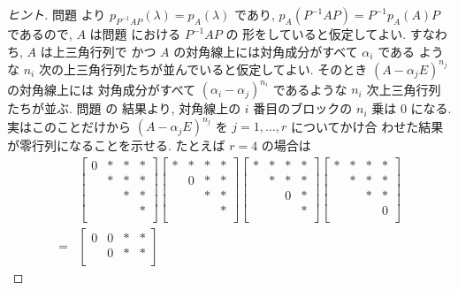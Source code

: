 \documentclass[12pt,twoside]{jarticle}
\begin{document}
\begin{proof}[ヒント]
  問題  より $p_{P^{-1}AP}(\lambda)=p_A(\lambda)$ 
  であり, $p_A(P^{-1}AP)=P^{-1}p_A(A)P$ であるので, 
  $A$ は問題  における $P^{-1}AP$ の
  形をしていると仮定してよい.  すなわち,  $A$ は上三角行列で
  かつ $A$ の対角線上には対角成分がすべて $\alpha_i$ である
  ような $n_i$ 次の上三角行列たちが並んでいると仮定してよい.  
  そのとき $(A-\alpha_j E)^{n_j}$ の対角線上には
  対角成分がすべて $(\alpha_i-\alpha_j)^{n_i}$ であるような $n_i$ 次上三角行列
  たちが並ぶ.  問題  の
  結果より, 対角線上の $i$ 番目のブロックの $n_i$ 乗は $0$ になる.
  実はこのことだけから $(A-\alpha_j E)^{n_j}$ を $j=1,\dots,r$ についてかけ合
  わせた結果が零行列になることを示せる.  たとえば $r=4$ の場合は
  \begin{align*}
    &
    \begin{bmatrix}
      0 & * & * & * \\
        & * & * & * \\
        &   & * & * \\
        &   &   & * \\
    \end{bmatrix}
    \begin{bmatrix}
      * & * & * & * \\
        & 0 & * & * \\
        &   & * & * \\
        &   &   & * \\
    \end{bmatrix}
    \begin{bmatrix}
      * & * & * & * \\
        & * & * & * \\
        &   & 0 & * \\
        &   &   & * \\
    \end{bmatrix}
    \begin{bmatrix}
      * & * & * & * \\
        & * & * & * \\
        &   & * & * \\
        &   &   & 0 \\
    \end{bmatrix}
    \\
    = &
    \begin{bmatrix}
      0 & 0 & * & * \\
        & 0 & * & * \\

\end{bmatrix}
\end{align*}
\end{proof}
\end{document}
